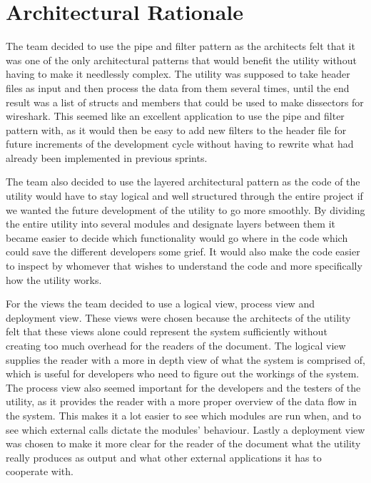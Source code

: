 \section{Architectural Rationale}
The team decided to use the pipe and filter pattern as the architects felt that it was one of the only architectural patterns that would benefit the \gls{utility} without having to make it needlessly complex. The \gls{utility} was supposed to take \gls{header} files as input and then process the data from them several times, until the end result was a list of \glspl{struct} and \glspl{member} that could be used to make \glspl{dissector} for \Gls{wireshark}. This seemed like an excellent application to use the pipe and filter pattern with, as it would then be easy to add new filters to the \gls{header} file for future increments of the development cycle without having to rewrite what had already been implemented in previous sprints.

The team also decided to use the layered architectural pattern as the code of the utility would have to stay logical and well structured through the entire project if we wanted the future development of the utility to go more smoothly. By dividing the entire utility into several modules and designate layers between them it became easier to decide which functionality would go where in the code which could save the different developers some grief. It would also make the code easier to inspect by whomever that wishes to understand the code and more specifically how the utility works.

For the views the team decided to use a logical view, process view and deployment view. These views were chosen because the architects of the \gls{utility} felt that these views alone could represent the system sufficiently without creating too much overhead for the readers of the document. The logical view supplies the reader with a more in depth view of what the system is comprised of, which is useful for developers who need to figure out the workings of the system. The process view also seemed important for the developers and the testers of the \gls{utility}, as it provides the reader with a more proper overview of the data flow in the system. This makes it a lot easier to see which modules are run when, and to see which external calls dictate the modules' behaviour. Lastly a deployment view was chosen to make it more clear for the reader of the document what the \gls{utility} really produces as output and what other external applications it has to cooperate with. 

